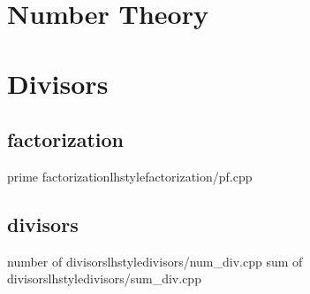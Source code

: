 \section{Number Theory}
    \section{Divisors}
      \subsection{factorization}
         {prime factorization}{lhstyle}{factorization/pf.cpp}
      \subsection{divisors}
         {number of divisors}{lhstyle}{divisors/num_div.cpp}
         {sum of divisors}{lhstyle}{divisors/sum_div.cpp}
    
